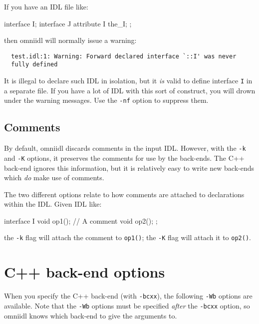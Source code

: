 \documentclass[11pt,twoside,a4paper]{book}
\newcommand{\intf}[1]{\texttt{#1}}
\newcommand{\op}[1]{\texttt{#1()}}
\newcommand{\cmdline}[1]{\texttt{#1}}
\begin{document}
If you have an IDL file like:

\begin{idllisting}
interface I;
interface J {
  attribute I the_I;
};
\end{idllisting}

\noindent then omniidl will normally issue a warning:

{\small
\begin{verbatim}
  test.idl:1: Warning: Forward declared interface `::I' was never
  fully defined
\end{verbatim}
}

\noindent It is illegal to declare such IDL in isolation, but it
\emph{is} valid to define interface \intf{I} in a separate file. If
you have a lot of IDL with this sort of construct, you will drown
under the warning messages. Use the \cmdline{-nf} option to suppress
them.


\subsection{Comments}

By default, omniidl discards comments in the input IDL. However, with
the \cmdline{-k} and \cmdline{-K} options, it preserves the comments
for use by the back-ends. The C++ back-end ignores this information,
but it is relatively easy to write new back-ends which \emph{do} make
use of comments.

The two different options relate to how comments are attached to
declarations within the IDL. Given IDL like:

\begin{idllisting}
interface I {
  void op1();
  // A comment
  void op2();
};
\end{idllisting}

\noindent the \cmdline{-k} flag will attach the comment to \op{op1};
the \cmdline{-K} flag will attach it to \op{op2}.



\section{C++ back-end options}

When you specify the C++ back-end (with \cmdline{-bcxx}), the
following \cmdline{-Wb} options are available. Note that the
\cmdline{-Wb} options must be specified \emph{after} the
\cmdline{-bcxx} option, so omniidl knows which back-end to give the
arguments to.
\end{document}
